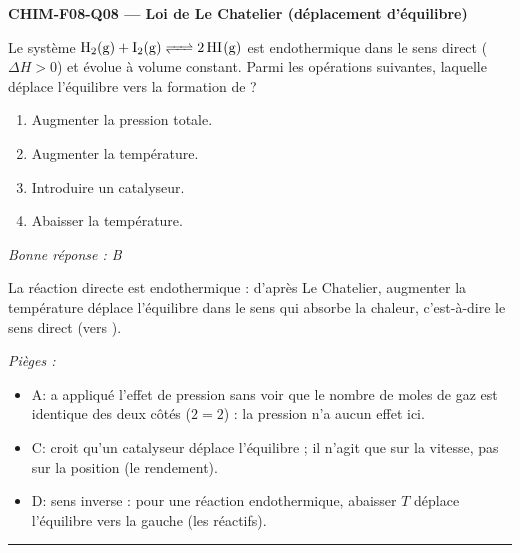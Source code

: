 \documentclass[11pt,a4paper]{article}
\begin{document}
\noindent\textbf{CHIM-F08-Q08 --- Loi de Le Chatelier (déplacement d'équilibre)}\par
Le système $\ce{H2(g) + I2(g) <=> 2 HI(g)}$ est endothermique dans le sens direct ($\Delta H>0$) et évolue à volume constant. Parmi les opérations suivantes, laquelle déplace l'équilibre vers la formation de  ?
\begin{enumerate}[label=\Alph*)]
\item Augmenter la pression totale.
\item Augmenter la température.
\item Introduire un catalyseur.
\item Abaisser la température.
\end{enumerate}
\textit{Bonne réponse : B}\par
La réaction directe est endothermique : d'après Le Chatelier, augmenter la température déplace l'équilibre dans le sens qui absorbe la chaleur, c'est-à-dire le sens direct (vers ).\par
\textit{Pièges :}
\begin{itemize}
\item A: a appliqué l'effet de pression sans voir que le nombre de moles de gaz est identique des deux côtés ($2=2$) : la pression n'a aucun effet ici.
\item C: croit qu'un catalyseur déplace l'équilibre ; il n'agit que sur la vitesse, pas sur la position (le rendement).
\item D: sens inverse : pour une réaction endothermique, abaisser $T$ déplace l'équilibre vers la gauche (les réactifs).
\end{itemize}
\vspace{8pt}\hrule\vspace{8pt}
\end{document}
